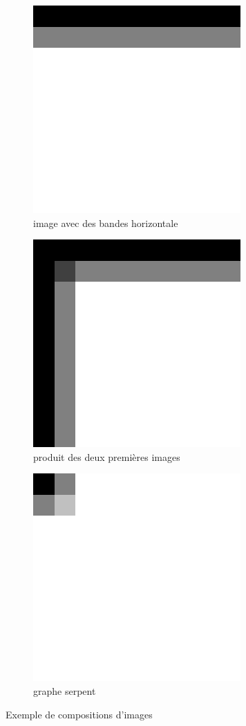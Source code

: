\documentclass[a4paper,10pt]{article}
\begin{document}
\begin{figure}[ht]
\begin{subfigure}[b]{.25\textwidth}
     \end{subfigure}
     \hfill
     \begin{subfigure}[b]{0.25\textwidth}
         \centering
         \includegraphics[scale=0.3]{whitheBlackV.png}
        \caption{image avec des bandes horizontale }
     \end{subfigure}
     \hfill
     \centering
     \begin{subfigure}[b]{0.25\textwidth}
         \centering
         \includegraphics[scale=0.3]{firstProduct.png}
        \caption{produit des deux premières images}
     \end{subfigure}
     \hfill
     \begin{subfigure}[b]{0.5\textwidth}
         \centering
    \includegraphics[scale=0.3]{firstScreen.png}
            \caption{graphe serpent}
     \end{subfigure}
        \caption{Exemple de compositions d'images}
\end{figure}
\end{document}
